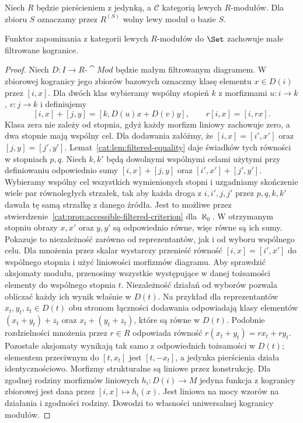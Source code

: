 Niech $R$ będzie pierścieniem z jedynką, a $\mathcal C$ kategorią lewych $R$-modułów. Dla zbioru $S$ oznaczamy przez $R^{(S)}$ wolny lewy moduł o bazie $S$.

\begin{lemat}\label{cat:lem:accessible-module-filtered}
Funktor zapominania z kategorii lewych $R$-modułów do $\Set$ zachowuje małe filtrowane kogranice.
\end{lemat}
\begin{proof}
Niech $D:I\to R\text{-}\cat{Mod}$ będzie małym filtrowanym diagramem. W zbiorowej kogranicy jego zbiorów bazowych oznaczmy klasę elementu $x\in D(i)$ przez $[i,x]$. Dla dwóch klas wybieramy wspólny stopień $k$ z morfizmami $u:i\to k$, $v:j\to k$ i definiujemy
\[
 [i,x]+[j,y]=[k,D(u)x+D(v)y],\qquad
 r[i,x]=[i,rx].
\]
Klasa zera nie zależy od stopnia, gdyż każdy morfizm liniowy zachowuje zero, a dwa stopnie mają wspólny cel. Dla dodawania załóżmy, że $[i,x]=[i',x']$ oraz $[j,y]=[j',y']$. Lemat~\ref{cat:lem:filtered-equality} daje świadków tych równości w stopniach $p,q$. Niech $k,k'$ będą dowolnymi wspólnymi celami użytymi przy definiowaniu odpowiednio sumy $[i,x]+[j,y]$ oraz $[i',x']+[j',y']$. Wybieramy wspólny cel wszystkich wymienionych stopni i uzgadniamy skończenie wiele par równoległych strzałek, tak aby każda droga z $i,i',j,j'$ przez $p,q,k,k'$ dawała tę samą strzałkę z danego źródła. Jest to możliwe przez stwierdzenie~\ref{cat:prop:accessible-filtered-criterion} dla $\aleph_0$. W otrzymanym stopniu obrazy $x,x'$ oraz $y,y'$ są odpowiednio równe, więc równe są ich sumy. Pokazuje to niezależność zarówno od reprezentantów, jak i od wyboru wspólnego celu. Dla mnożenia przez skalar wystarczy przenieść równość $[i,x]=[i',x']$ do wspólnego stopnia i użyć liniowości morfizmów diagramu. Aby sprawdzić aksjomaty modułu, przenosimy wszystkie występujące w danej tożsamości elementy do wspólnego stopnia $t$. Niezależność działań od wyborów pozwala obliczać każdy ich wynik właśnie w $D(t)$. Na przykład dla reprezentantów $x_t,y_t,z_t\in D(t)$ obu stronom łączności dodawania odpowiadają klasy elementów $(x_t+y_t)+z_t$ oraz $x_t+(y_t+z_t)$, które są równe w $D(t)$. Podobnie rozdzielności mnożenia przez $r\in R$ odpowiada równość $r(x_t+y_t)=rx_t+ry_t$. Pozostałe aksjomaty wynikają tak samo z odpowiednich tożsamości w $D(t)$; elementem przeciwnym do $[t,x_t]$ jest $[t,-x_t]$, a jedynka pierścienia działa identycznościowo. Morfizmy strukturalne są liniowe przez konstrukcję. Dla zgodnej rodziny morfizmów liniowych $h_i:D(i)\to M$ jedyna funkcja z kogranicy zbiorowej jest dana przez $[i,x]\mapsto h_i(x)$. Jest liniowa na mocy wzorów na działania i zgodności rodziny. Dowodzi to własności uniwersalnej kogranicy modułów.
\end{proof}

